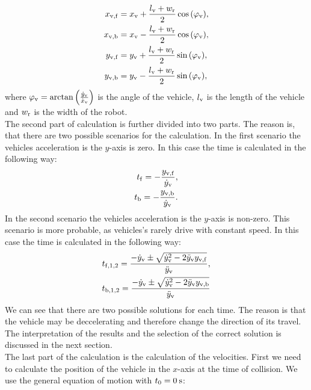         \begin{align}
            x_{\rm{v,f}} &= x_{\rm{v}} + \frac{l_{\rm{v}}+w_{\rm{r}}}{2}\cos{(\varphi_{\rm{v}})},\\
            x_{\rm{v,b}} &= x_{\rm{v}} - \frac{l_{\rm{v}}+w_{\rm{r}}}{2}\cos{(\varphi_{\rm{v}})},\\
            y_{\rm{v,f}} &= y_{\rm{v}} + \frac{l_{\rm{v}}+w_{\rm{r}}}{2}\sin{(\varphi_{\rm{v}})},\\
            y_{\rm{v,b}} &= y_{\rm{v}} - \frac{l_{\rm{v}}+w_{\rm{r}}}{2}\sin{(\varphi_{\rm{v}})},
        \end{align}
        where $\varphi_{\rm{v}} = \arctan{\left(\frac{\dot{y}_{\rm{v}}}{\dot{x}_{\rm{v}}}\right)}$ is the angle of the vehicle, $l_{\rm{v}}$ is the length of the vehicle and $w_{\rm{r}}$ is the width of the robot.\\
        The second part of calculation is further divided into two parts. The reason is, that there are two possible scenarios for the calculation. In the first scenario the vehicles acceleration is the $y$-axis is zero. In this case the time is calculated in the following way:
        \begin{align}
            t_{\rm{f}} = -\frac{y_{\rm{v,f}}}{\dot{y}_{\rm{v}}},\\
            t_{\rm{b}} = -\frac{y_{\rm{v,b}}}{\dot{y}_{\rm{v}}}.
        \end{align}
        In the second scenario the vehicles acceleration is the $y$-axis is non-zero. This scenario is more probable, as vehicles's rarely drive with constant speed. In this case the time is calculated in the following way:
        \begin{align}
            t_{\rm{f},1,2} = \frac{-\dot{y}_{\rm{v}}\pm\sqrt{\dot{y}_{\rm{v}}^2-2\ddot{y}_{\rm{v}}y_{\rm{v,f}}}}{\ddot{y}_{\rm{v}}},\\
            t_{\rm{b},1,2} = \frac{-\dot{y}_{\rm{v}}\pm\sqrt{\dot{y}_{\rm{v}}^2-2\ddot{y}_{\rm{v}}y_{\rm{v,b}}}}{\ddot{y}_{\rm{v}}}
        \end{align}
        We can see that there are two possible solutions for each time. The reason is that the vehicle may be deccelerating and therefore change the direction of its travel. The interpretation of the results and the selection of the correct solution is discussed in the next section.\\
        The last part of the calculation is the calculation of the velocities. First we need to calculate the position of the vehicle in the $x$-axis at the time of collision. We use the general equation of motion \cite{equation_motion} with $t_{0}=0\:\rm{s}$:
